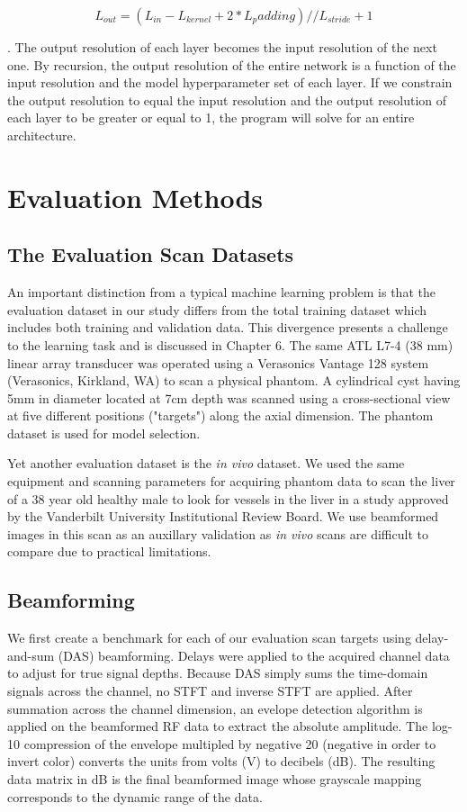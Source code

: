 $$
L_{out} = (L_{in} - L_{kernel} + 2 * L_padding) // L_{stride} + 1
$$

. The output resolution of each layer becomes the input resolution of the next one. By recursion, the output resolution of the entire network is a function of the input resolution and the model hyperparameter set of each layer. If we constrain the output resolution to equal the input resolution and the output resolution of each layer to be greater or equal to 1, the program will solve for an entire architecture.

\section{Evaluation Methods}

\subsection{The Evaluation Scan Datasets}

An important distinction from a typical machine learning problem is that the evaluation dataset in our study differs from the total training dataset which includes both training and validation data. This divergence presents a challenge to the learning task and is discussed in Chapter 6. The same ATL L7-4 (38 mm) linear array transducer was operated using a Verasonics Vantage 128 system (Verasonics, Kirkland, WA) to scan a physical phantom. A cylindrical cyst having 5mm in diameter located at 7cm depth was scanned using a cross-sectional view at five different positions ("targets") along the axial dimension. The phantom dataset is used for model selection.

Yet another evaluation dataset is the \textit{in vivo} dataset. We used the same equipment and scanning parameters for acquiring phantom data to scan the liver of a 38 year old healthy male to look for vessels in the liver in a study approved by the Vanderbilt University Institutional Review Board. We use beamformed images in this scan as an auxillary validation as \textit{in vivo} scans are difficult to compare due to practical limitations.

\subsection{Beamforming}

We first create a benchmark for each of our evaluation scan targets using delay-and-sum (DAS) beamforming. Delays were applied to the acquired channel data to adjust for true signal depths. Because DAS simply sums the time-domain signals across the channel, no STFT and inverse STFT are applied. After summation across the channel dimension, an evelope detection algorithm is applied on the beamformed RF data to extract the absolute amplitude. The log-10 compression of the envelope multipled by negative 20 (negative in order to invert color) converts the units from volts (V) to decibels (dB). The resulting data matrix in dB is the final beamformed image whose grayscale mapping corresponds to the dynamic range of the data.

